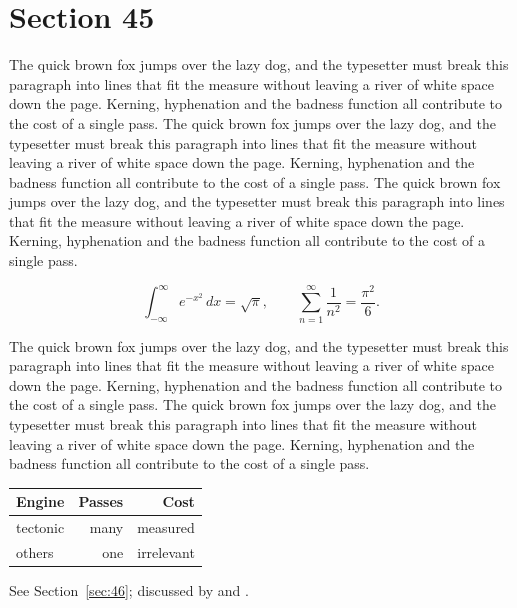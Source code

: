 \documentclass{article}
\begin{document}
\section{Section 45}
\label{sec:45}
The quick brown fox jumps over the lazy dog, and the typesetter must break this paragraph into lines that fit the measure without leaving a river of white space down the page. Kerning, hyphenation and the badness function all contribute to the cost of a single pass. The quick brown fox jumps over the lazy dog, and the typesetter must break this paragraph into lines that fit the measure without leaving a river of white space down the page. Kerning, hyphenation and the badness function all contribute to the cost of a single pass. The quick brown fox jumps over the lazy dog, and the typesetter must break this paragraph into lines that fit the measure without leaving a river of white space down the page. Kerning, hyphenation and the badness function all contribute to the cost of a single pass. 

\begin{equation}\label{eq:45}
\int_{-\infty}^{\infty} e^{-x^{2}}\,dx = \sqrt{\pi}, \qquad
\sum_{n=1}^{\infty} \frac{1}{n^{2}} = \frac{\pi^{2}}{6}.
\end{equation}

The quick brown fox jumps over the lazy dog, and the typesetter must break this paragraph into lines that fit the measure without leaving a river of white space down the page. Kerning, hyphenation and the badness function all contribute to the cost of a single pass. The quick brown fox jumps over the lazy dog, and the typesetter must break this paragraph into lines that fit the measure without leaving a river of white space down the page. Kerning, hyphenation and the badness function all contribute to the cost of a single pass. 

\begin{center}
\begin{tabular}{lrr}
\toprule
Engine & Passes & Cost \\
\midrule
tectonic & many & measured \\
others & one & irrelevant \\
\bottomrule
\end{tabular}
\end{center}

See Section~\ref{sec:46}; discussed by \textcite{k1} and \textcite{l3}.
\end{document}
